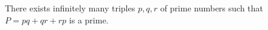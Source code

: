 \documentclass[12pt]{article}
\begin{document}
There exists infinitely many triples $p,q,r$ of prime numbers such that $P=pq+qr+rp$ is a prime. \\
\end{document}
